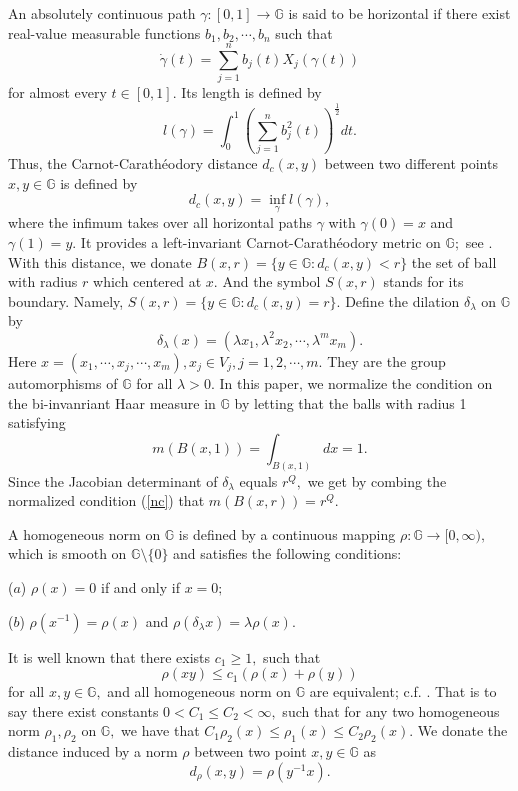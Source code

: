 \documentclass[11pt,twoside]{article}
\theoremstyle{definition}
\theoremstyle{remark}
\begin{document}
An absolutely continuous path $\gamma:[0,1]\rightarrow\mathbb{G}$ is said to be horizontal if there exist real-value measurable functions $b_{1},b_{2},\cdots,b_{n}$ such that 
$$\dot{\gamma}(t)=\sum_{j=1}^{n}b_{j}(t)X_{j}(\gamma(t))$$
for almost every $t\in[0,1].$ Its length is defined by 
$$l(\gamma)=\int_{0}^{1}\left(\sum_{j=1}^{n}b_{j}^{2}(t)\right)^{\frac{1}{2}}dt.$$
Thus, the Carnot-Carath\'{e}odory distance $d_{c}(x,y)$ between two different points $x,y\in \mathbb{G}$ is defined by 
$$d_{c}(x,y)=\inf_{\gamma}l(\gamma),$$
where the infimum takes over all horizontal paths $\gamma$ with $\gamma(0)=x$ and  $\gamma(1)=y.$
It provides a left-invariant  Carnot-Carath\'{e}odory metric on $\mathbb{G};$ see \cite{Cho39, Str86}. With this distance, we donate $B(x,r)=\{y\in \mathbb{G}:d_{c}(x,y)<r\}$ the set of ball with radius $r$ which centered at $x.$ And the symbol $S(x,r)$ stands for its boundary. Namely,   $S(x,r)=\{y\in \mathbb{G}:d_{c}(x,y)=r\}.$ Define the dilation $\delta_{\lambda}$ on $\mathbb{G}$ by 
$$\delta_{\lambda}(x)=(\lambda x_{1},\lambda^{2}x_{2},\cdots,\lambda^{m}x_{m}).$$ Here $x=(x_{1},\cdots,x_{j},\cdots,x_{m}), x_{j}\in V_{j},j=1,2,\cdots,m.$
 They are the group automorphisms of  $\mathbb{G}$ for all $\lambda>0.$ In this paper, we normalize the condition on the bi-invanriant Haar measure in $\mathbb{G}$ by letting that the balls with radius 1 satisfying 
\begin{equation}\label{nc}
m(B(x,1))=\int_{B(x,1)}dx=1.
\end{equation}
Since the Jacobian determinant of $\delta_{\lambda}$ equals $r^{Q},$  we get by combing the normalized condition (\ref{nc}) that $m(B(x,r))=r^{Q}.$  
 
 
 
 A homogeneous norm on $\mathbb{G}$ is defined by a continuous mapping $\rho:\mathbb{G}\rightarrow[0,\infty),$ which is smooth on $\mathbb{G}\setminus\{0\}$ and satisfies the following conditions:

($a$) $\rho(x)=0$ if and only if $x=0;$

($b$)  $\rho(x^{-1})=\rho(x)$ and $\rho(\delta_{\lambda}x)=\lambda\rho(x).$ 


It is well known that there exists $c_{1}\geq1,$ such that 
\begin{equation}\label{00oo}
\rho(xy)\leq c_{1}(\rho(x)+\rho(y))
\end{equation} for all $x,y\in\mathbb{G},$ and all homogeneous norm on $\mathbb{G}$ are equivalent; c.f. \cite{FS82}. That is to say there exist constants 
$0<C_{1}\leq C_{2}<\infty,$ such that for any two homogeneous norm $\rho_{1},\rho_{2}$ on $\mathbb{G},$ we have that $C_{1}\rho_{2}(x)\leq\rho_{1}(x)\leq C_{2}\rho_{2}(x).$ We donate the distance
 induced by a norm $\rho$ between two point $x,y\in\mathbb{G}$  as $$d_{\rho}(x,y)=\rho(y^{-1}x).$$
\end{document}
